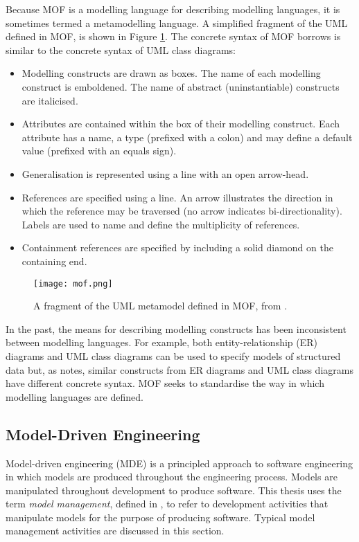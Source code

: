 Because MOF is a modelling language for describing modelling languages, it is sometimes termed a metamodelling language. A simplified fragment of the UML defined in MOF, is shown in Figure \ref{fig:mof}. The concrete syntax of MOF borrows is similar to the concrete syntax of UML class diagrams:

\begin{itemize}
 \item Modelling constructs are drawn as boxes. The name of each modelling construct is emboldened. The name of abstract (uninstantiable) constructs are italicised.
 \item Attributes are contained within the box of their modelling construct. Each attribute has a name, a type (prefixed with a colon) and may define a default value (prefixed with an equals sign).
 \item Generalisation is represented using a line with an open arrow-head.
 \item References are specified using a line. An arrow illustrates the direction in which the reference may be traversed (no arrow indicates bi-directionality). Labels are used to name and define the multiplicity of references.
 \item Containment references are specified by including a solid diamond on the containing end.
\end{itemize}

\begin{figure}[htbp]
  \begin{center}
    \leavevmode
    \texttt{[image: mof.png]}
  \end{center}
  \caption{A fragment of the UML metamodel defined in MOF, from \cite{uml212}.}
  \label{fig:mof}
\end{figure}

In the past, the means for describing modelling constructs has been inconsistent between modelling languages. For example, both entity-relationship (ER) diagrams and UML class diagrams can be used to specify models of structured data but, as \cite[pg97]{frankel02mda} notes, similar constructs from ER diagrams and UML class diagrams have different concrete syntax. MOF seeks to standardise the way in which modelling languages are defined.


\subsection{Model-Driven Engineering}
\label{sec:mde}
Model-driven engineering (MDE) is a principled approach to software engineering in which models are produced throughout the engineering process. Models are manipulated throughout development to produce software. This thesis uses the term \emph{model management}, defined in \cite{kolovos09thesis}, to refer to development activities that manipulate models for the purpose of producing software. Typical model management activities are discussed in this section.

